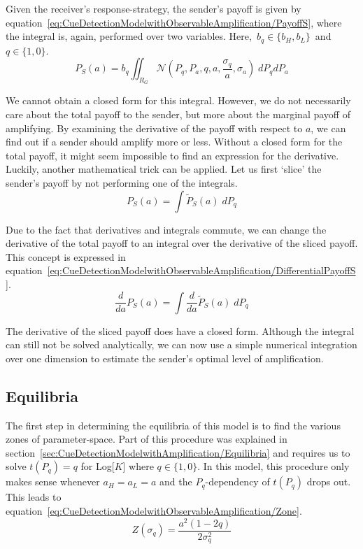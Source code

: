 \documentclass[a4paper,12pt]{article}
\numberwithin{equation}{section}
\begin{document}
Given the receiver's response-strategy, the sender's payoff is given by equation~\ref{eq:CueDetectionModelwithObservableAmplification/PayoffS}, where the integral is, again, performed over two variables. \mbox{Here, $b_{q} \in \{b_{H}, b_{L}\}$ and $q \in \{1, 0\}$.}
\begin{equation}
\label{eq:CueDetectionModelwithObservableAmplification/PayoffS}
P_{S}(a) = b_{q} \displaystyle \iint_{R_{G}} \mathcal{N}(P_{q}, P_{a}, q, a, \frac{\sigma_{q}}{a}, \sigma_{a}) \; dP_{q}dP_{a}
\end{equation}

We cannot obtain a closed form for this integral. However, we do not necessarily care about the total payoff to the sender, but more about the marginal payoff of amplifying. By examining the derivative of the payoff with respect to $a$, we can find out if a sender should amplify more or less. Without a closed form for the total payoff, it might seem impossible to find an expression for the derivative. Luckily, another mathematical trick can be applied. Let us first `slice' the sender's payoff by not performing one of the integrals.
\begin{equation}
\label{eq:CueDetectionModelwithObservableAmplification/SlicedPayoffS}
P_{S}(a) = \displaystyle \int \tilde{P}_{S}(a) \; dP_{q}
\end{equation}

Due to the fact that derivatives and integrals commute, we can change the derivative of the total payoff to an integral over the derivative of the sliced payoff. This concept is expressed in equation~\ref{eq:CueDetectionModelwithObservableAmplification/DifferentialPayoffS}.
\begin{equation}
\label{eq:CueDetectionModelwithObservableAmplification/DifferentialPayoffS}
\frac{d}{da} P_{S}(a) = \displaystyle \int \frac{d}{da} \tilde{P}_{S}(a) \; dP_{q}
\end{equation}

The derivative of the sliced payoff does have a closed form. Although the integral can still not be solved analytically, we can now use a simple numerical integration over one dimension to estimate the sender's optimal level of amplification.


\subsection{Equilibria}
\label{sec:CueDetectionModelwithObservableAmplification/Equilibria}

The first step in determining the equilibria of this model is to find the various zones of parameter-space. Part of this procedure was explained in section~\ref{sec:CueDetectionModelwithAmplification/Equilibria} and requires us to solve $t(P_{q})=q$ for Log[$K$] where $q \in \{1, 0\}$. In this model, this procedure only makes sense whenever $a_{H}=a_{L}=a$ and the $P_{q}$-dependency of $t(P_{q})$ drops out. This leads to equation~\ref{eq:CueDetectionModelwithObservableAmplification/Zone}.
\begin{equation}
\label{eq:CueDetectionModelwithObservableAmplification/Zone}
Z(\sigma_{q})=\frac{a^{2} (1 - 2 q)}{2 \sigma_{q}^{2}}
\end{equation}
\end{document}
